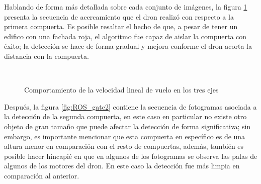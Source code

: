Hablando de forma más detallada sobre cada conjunto de imágenes, la figura \ref{fig:ROS_gate1} presenta la secuencia de acercamiento que el dron realizó con respecto a la primera compuerta. Es posible resaltar el hecho de que, a pesar de tener un edifico con una fachada roja, el algoritmo fue capaz de aislar la compuerta con éxito; la detección se hace de forma gradual y mejora conforme el dron acorta la distancia con la compuerta.

\begin{figure}[ht]
    \centering
     \hspace{0.2 pt}
     \hspace{0.2 pt}
     \hspace{0.2 pt}
     \\
     \hspace{0.2 pt}
     \hspace{0.2 pt}
     \hspace{0.2 pt}
    
    \caption{Comportamiento de la velocidad lineal de vuelo en los tres ejes}
    \label{fig:ROS_gate1}
\end{figure}

Después, la figura \ref{fig:ROS_gate2} contiene la secuencia de fotogramas asociada a la detección de la segunda compuerta, en este caso en particular no existe otro objeto de gran tamaño que puede afectar la detección de forma significativa; sin embargo, es importante mencionar que esta compuerta en específico es de una altura menor en comparación con el resto de compuertas, además, también es posible hacer hincapié en que en algunos de los fotogramas se observa las palas de algunos de los motores del dron. En este caso la detección fue más limpia en comparación al anterior.

